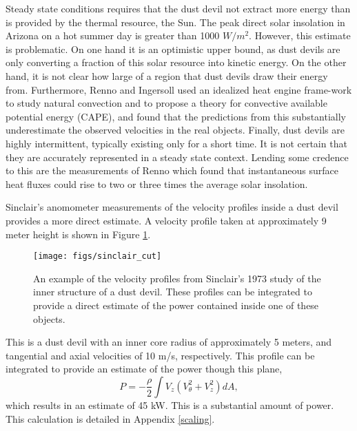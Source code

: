 Steady state conditions requires that the dust devil not
extract more energy than is provided by the thermal resource, the Sun.   
The peak direct solar insolation in Arizona on a hot summer day is
greater than 1000 $W/m^2$. However, this estimate is problematic. 
On one hand it is an optimistic upper bound, as dust devils are only
converting a fraction of this solar resource into kinetic
energy. On the other hand, it is not clear how large of a region
that dust devils draw their energy from. 
Furthermore, Renno and Ingersoll\cite{renno_inger} used an
idealized heat engine frame-work to study natural convection and to
propose a theory for convective available potential energy (CAPE),
and found that the predictions from this substantially underestimate the
observed velocities in the real objects. Finally, dust devils are highly 
intermittent, typically existing only for a short time. It is
not certain that they are accurately represented in a steady
state context. Lending some credence to this are the measurements of
Renno\cite{?} which found that instantaneous surface heat fluxes could
rise to two or three times the average solar insolation. 

Sinclair's anomometer measurements of the velocity profiles inside a dust 
devil provides a more direct estimate. A velocity profile taken 
at approximately 9 meter height is shown in Figure \ref{fig:sinclair_profile}. 

  \begin{figure}[!htb]
    \begin{center}
     \texttt{[image: figs/sinclair\_cut]}
     \caption{An example of the velocity profiles from Sinclair's 1973
     study of the inner structure of a dust devil. These profiles can be
     integrated to provide a direct estimate of the power contained
     inside one of these objects.}
     \label{fig:sinclair_profile}
    \end{center}
  \end{figure}

This is a dust devil with an inner core radius of approximately 
5 meters, and tangential and axial velocities of 10 m/s, respectively. 
This profile can be integrated to provide an estimate of the power
though this plane,  
\begin{equation}
 P = -\frac{\rho }{2} \int V_z (V_{\theta}^2 + V_z^2 ) dA, 
\end{equation}
which results in an estimate of 45 kW. This is a substantial amount of
power. This calculation is detailed in Appendix \ref{scaling}. 

